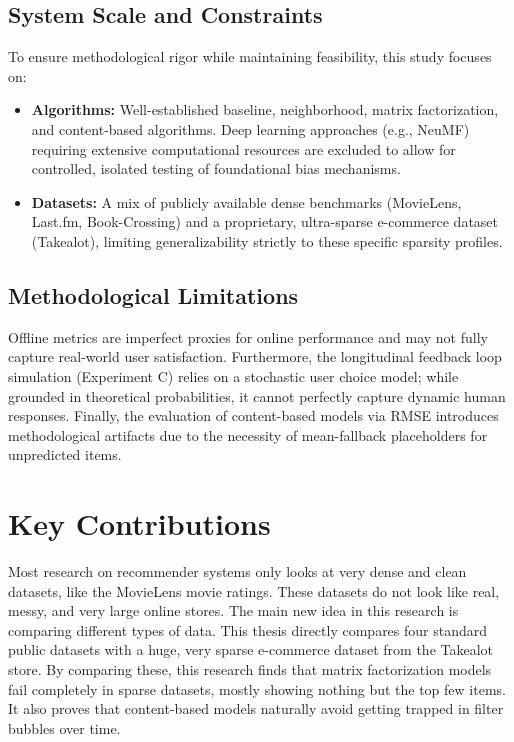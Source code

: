 \documentclass[11pt,a4paper]{report}
\begin{document}
\subsection{System Scale and Constraints}
To ensure methodological rigor while maintaining feasibility, this study focuses on:
\begin{itemize}
    \item \textbf{Algorithms:} Well-established baseline, neighborhood, matrix factorization, and content-based algorithms. Deep learning approaches (e.g., NeuMF) requiring extensive computational resources are excluded to allow for controlled, isolated testing of foundational bias mechanisms.
    \item \textbf{Datasets:} A mix of publicly available dense benchmarks (MovieLens, Last.fm, Book-Crossing) and a proprietary, ultra-sparse e-commerce dataset (Takealot), limiting generalizability strictly to these specific sparsity profiles.
\end{itemize}

\subsection{Methodological Limitations}
Offline metrics are imperfect proxies for online performance and may not fully capture real-world user satisfaction. Furthermore, the longitudinal feedback loop simulation (Experiment C) relies on a stochastic user choice model; while grounded in theoretical probabilities, it cannot perfectly capture dynamic human responses. Finally, the evaluation of content-based models via RMSE introduces methodological artifacts due to the necessity of mean-fallback placeholders for unpredicted items.

\section{Key Contributions}
Most research on recommender systems only looks at very dense and clean datasets, like the MovieLens movie ratings. These datasets do not look like real, messy, and very large online stores. The main new idea in this research is comparing different types of data. This thesis directly compares four standard public datasets with a huge, very sparse e-commerce dataset from the Takealot store. By comparing these, this research finds that matrix factorization models fail completely in sparse datasets, mostly showing nothing but the top few items. It also proves that content-based models naturally avoid getting trapped in filter bubbles over time.
\end{document}
